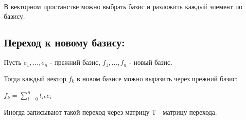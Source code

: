 \documentclass[12pt]{article}
\begin{document}
    В векторном простанстве можно выбрать базис и разложить каждый элемент по базису.

    \subsection{Переход к новому базису:}

    Пусть $e_{1},...,e_{n}$ - прежний базис, $f_{1},...,f_{n}$ - новый базис.

    Тогда каждый вектор $f_{k}$ в новом базисе можно выразить через прежний базис:

$f_{k} = \sum\limits_{i=0}^n t_{ik}e_{i}$

Иногда записывают такой переход через матрицу Т - матрицу перехода.
\end{document}
